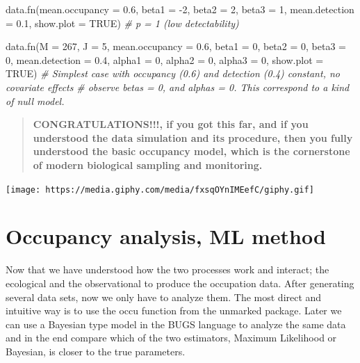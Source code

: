 \documentclass[
]{book}
\newenvironment{Shaded}{\begin{snugshade}}{\end{snugshade}}
\newcommand{\AttributeTok}[1]{\textcolor[rgb]{0.77,0.63,0.00}{#1}}
\newcommand{\CommentTok}[1]{\textcolor[rgb]{0.56,0.35,0.01}{\textit{#1}}}
\newcommand{\ConstantTok}[1]{\textcolor[rgb]{0.00,0.00,0.00}{#1}}
\newcommand{\DecValTok}[1]{\textcolor[rgb]{0.00,0.00,0.81}{#1}}
\newcommand{\FloatTok}[1]{\textcolor[rgb]{0.00,0.00,0.81}{#1}}
\newcommand{\FunctionTok}[1]{\textcolor[rgb]{0.00,0.00,0.00}{#1}}
\newcommand{\NormalTok}[1]{#1}
\newcommand{\SpecialCharTok}[1]{\textcolor[rgb]{0.00,0.00,0.00}{#1}}
\begin{document}
\begin{Shaded}
\begin{Highlighting}[]
\FunctionTok{data.fn}\NormalTok{(}\AttributeTok{mean.occupancy =} \FloatTok{0.6}\NormalTok{, }\AttributeTok{beta1 =} \SpecialCharTok{{-}}\DecValTok{2}\NormalTok{, }\AttributeTok{beta2 =} \DecValTok{2}\NormalTok{, }\AttributeTok{beta3 =} \DecValTok{1}\NormalTok{, }
        \AttributeTok{mean.detection =} \FloatTok{0.1}\NormalTok{, }\AttributeTok{show.plot =} \ConstantTok{TRUE}\NormalTok{)  }\CommentTok{\# p = 1 (low detectability)}

\FunctionTok{data.fn}\NormalTok{(}\AttributeTok{M =} \DecValTok{267}\NormalTok{, }\AttributeTok{J =} \DecValTok{5}\NormalTok{, }\AttributeTok{mean.occupancy =} \FloatTok{0.6}\NormalTok{, }\AttributeTok{beta1 =} \DecValTok{0}\NormalTok{, }\AttributeTok{beta2 =} \DecValTok{0}\NormalTok{, }\AttributeTok{beta3 =} \DecValTok{0}\NormalTok{, }
        \AttributeTok{mean.detection =} \FloatTok{0.4}\NormalTok{, }\AttributeTok{alpha1 =} \DecValTok{0}\NormalTok{, }\AttributeTok{alpha2 =} \DecValTok{0}\NormalTok{, }\AttributeTok{alpha3 =} \DecValTok{0}\NormalTok{, }\AttributeTok{show.plot =} \ConstantTok{TRUE}\NormalTok{)}
\CommentTok{\# Simplest case with occupancy (0.6) and detection (0.4) constant, no covariate effects}
\CommentTok{\# observe betas = 0, and alphas = 0. This correspond to a kind of null model.}
\end{Highlighting}
\end{Shaded}

\begin{quote}
\textbf{CONGRATULATIONS!!!, if you got this far, and if you understood the data simulation and its procedure, then you fully understood the basic occupancy model, which is the cornerstone of modern biological sampling and monitoring.}
\end{quote}

\texttt{[image: https://media.giphy.com/media/fxsqOYnIMEefC/giphy.gif]}

\hypertarget{unmarked}{%
\chapter{Occupancy analysis, ML method}\label{unmarked}}

Now that we have understood how the two processes work and interact; the ecological and the observational to produce the occupation data. After generating several data sets, now we only have to analyze them. The most direct and intuitive way is to use the occu function from the unmarked \citep{Fiske2011} package. Later we can use a Bayesian type model in the BUGS language to analyze the same data and in the end compare which of the two estimators, Maximum Likelihood or Bayesian, is closer to the true parameters.
\end{document}
